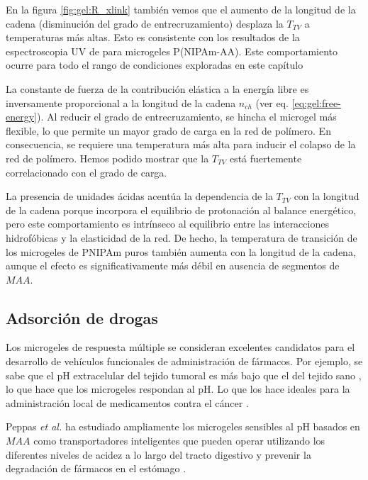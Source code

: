 En la figura \ref{fig:gel:R_xlink} tambi\'en vemos que el aumento de la longitud de la cadena (disminuci\'on del grado de entrecruzamiento) desplaza la $T_{TV}$ a temperaturas m\'as altas.
Esto es consistente con los resultados de la espectroscopia UV de  \citet{Lee2008} para microgeles P(NIPAm-AA).
Este comportamiento ocurre para todo el rango de condiciones exploradas en este cap\'itulo %


La constante de fuerza de la contribuci\'on el\'astica a la energ\'ia libre es inversamente proporcional a la longitud de la cadena $n_{ch}$ (ver eq. \ref{eq:gel:free-energy}).
Al reducir el grado de entrecruzamiento, se hincha el microgel m\'as flexible, lo que permite un mayor grado de carga en la red de pol\'imero.
En consecuencia, se requiere una temperatura m\'as alta para inducir el colapso de la red de pol\'imero.
Hemos podido mostrar que la $T_{TV}$ est\'a fuertemente correlacionado con el grado de carga.


La presencia de unidades \'acidas acent\'ua la dependencia de  la $T_{TV}$ con la longitud de la cadena porque incorpora el equilibrio de protonaci\'on al balance energ\'etico, pero este comportamiento es intr\'inseco al equilibrio entre las interacciones hidrof\'obicas y la elasticidad de la red.
De hecho, la temperatura de transici\'on de los microgeles de PNIPAm puros tambi\'en aumenta con la longitud de la cadena, aunque el efecto es significativamente m\'as d\'ebil en ausencia de segmentos de $MAA$.


\subsection{Adsorci\'on de drogas}\label{sec:gel:ads-drogas}

Los microgeles de respuesta m\'ultiple se consideran excelentes candidatos para el desarrollo de veh\'iculos funcionales de administraci\'on de f\'armacos.
Por ejemplo, se sabe que el pH extracelular del tejido tumoral es m\'as bajo que el del tejido sano \cite{Gerweck1996}, lo que hace que los microgeles respondan al pH.
Lo que los hace ideales para la administraci\'on local de medicamentos contra el c\'ancer  \cite{Dadsetan2013}.

Peppas \emph{et al.} ha estudiado ampliamente los microgeles sensibles al pH basados en $MAA$ como transportadores inteligentes que pueden operar utilizando los diferentes niveles de acidez a lo largo del tracto digestivo y prevenir la degradaci\'on de f\'armacos en el est\'omago \cite{TorresLugo2002, Carr2010, DuranLobato2014, Sharpe2018}.


